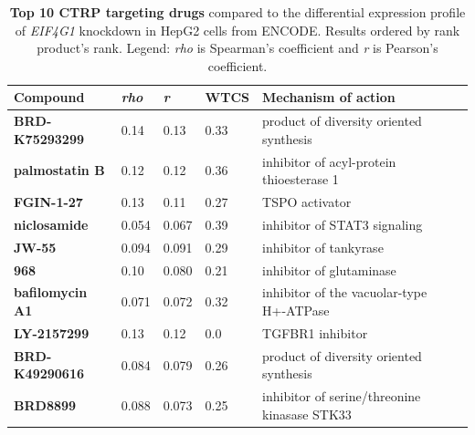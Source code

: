 \begin{table}[!ht]
\centering
\footnotesize
\caption[Top 10 CTRP 2.1 targeting drugs]{\textbf{Top 10 CTRP targeting drugs} compared to the differential expression profile of \emph{EIF4G1} knockdown in HepG2 cells from ENCODE. Results ordered by rank product's rank. Legend: \emph{rho} is Spearman's coefficient and \emph{r} is Pearson's coefficient.}
\label{tab:eif4g1-ctrp}

\begin{tabular}{llllll}
\toprule
\textbf{Compound}           & \textbf{\emph{rho}} & \textbf{\emph{r}} & \textbf{WTCS} & \textbf{Mechanism of action}                                                         \\
\midrule
\textbf{BRD-K75293299}  & 0.14                    & 0.13                   & 0.33          & product of diversity oriented synthesis                              \\
\textbf{palmostatin B}  & 0.12                    & 0.12                   & 0.36          & inhibitor of acyl-protein thioesterase 1                             \\
\textbf{FGIN-1-27}      & 0.13                    & 0.11                   & 0.27          & TSPO activator \\
\textbf{niclosamide}    & 0.054                   & 0.067                  & 0.39          & inhibitor of STAT3 signaling                                         \\
\textbf{JW-55}          & 0.094                   & 0.091                  & 0.29          & inhibitor of tankyrase                                               \\
\textbf{968}            & 0.10                    & 0.080                  & 0.21          & inhibitor of glutaminase                                             \\
\textbf{bafilomycin A1} & 0.071                   & 0.072                  & 0.32          & inhibitor of the vacuolar-type H+-ATPase                             \\
\textbf{LY-2157299}     & 0.13                    & 0.12                   & 0.0           & TGFBR1 inhibitor      \\
\textbf{BRD-K49290616}  & 0.084                   & 0.079                  & 0.26          & product of diversity oriented synthesis                              \\
\textbf{BRD8899}        & 0.088                   & 0.073                  & 0.25          & inhibitor of serine/threonine kinasase STK33                        \\
\bottomrule
\end{tabular}
\end{table}

